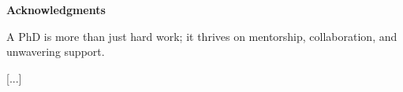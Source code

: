 \begin{center}
    \bfseries \LARGE \color{Prune} Acknowledgments
\end{center}
\vspace{1cm}

A PhD is more than just hard work; it thrives on mentorship, collaboration, and unwavering support.

[...]